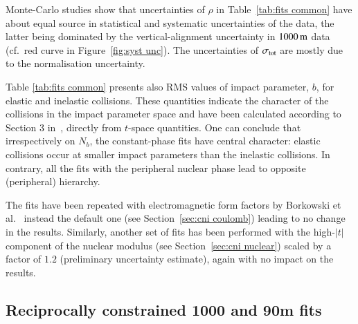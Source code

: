 Monte-Carlo studies show that uncertainties of $\rho$ in Table~\ref{tab:fits common} have about equal source in statistical and systematic uncertainties of the data, the latter being dominated by the vertical-alignment uncertainty in $1000\,{\rm m}$ data (cf.~red curve in Figure~\ref{fig:syst unc}).
The uncertainties of $\sigma_{\rm tot}$ are mostly due to the normalisation uncertainty.

Table \ref{tab:fits common} presents also RMS values of impact parameter, $b$, for elastic and inelastic collisions. These quantities indicate the character of the collisions in the impact parameter space and have been calculated according to Section 3 in~\cite{klk02}, directly from $t$-space quantities. One can conclude that irrespectively on $N_b$, the constant-phase fits have central character: elastic collisions occur at smaller impact parameters than the inelastic collisions. In contrary, all the fits with the peripheral nuclear phase lead to opposite (peripheral) hierarchy.

The fits have been repeated with electromagnetic form factors by Borkowski et al.~\cite{borkowski} instead the default one (see Section~\ref{sec:cni coulomb}) leading to no change in the results. Similarly, another set of fits has been performed with the high-$|t|$ component of the nuclear modulus (see Section~\ref{sec:cni nuclear}) scaled by a factor of $1.2$ (preliminary uncertainty estimate), again with no impact on the results.



\subsection{Reciprocally constrained 1000 and 90m fits}
\label{sec:cni reciprocal fits}

